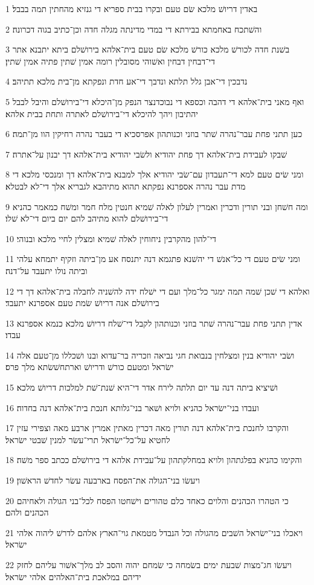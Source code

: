 \par 1 באדין דריושׁ מלכא שׂם טעם ובקרו בבית ספריא די גנזיא מהחתין תמה בבבל׃
\par 2 והשׁתכח באחמתא בבירתא די במדי מדינתה מגלה חדה וכן־כתיב בגוה דכרונה׃
\par 3 בשׁנת חדה לכורשׁ מלכא כורשׁ מלכא שׂם טעם בית־אלהא בירושׁלם ביתא יתבנא אתר די־דבחין דבחין ואשׁוהי מסובלין רומה אמין שׁתין פתיה אמין שׁתין׃
\par 4 נדבכין די־אבן גלל תלתא ונדבך די־אע חדת ונפקתא מן־בית מלכא תתיהב׃
\par 5 ואף מאני בית־אלהא די דהבה וכספא די נבוכדנצר הנפק מן־היכלא די־בירושׁלם והיבל לבבל יהתיבון ויהך להיכלא די־בירושׁלם לאתרה ותחת בבית אלהא׃
\par 6 כען תתני פחת עבר־נהרה שׁתר בוזני וכנותהון אפרסכיא די בעבר נהרה רחיקין הוו מן־תמה׃
\par 7 שׁבקו לעבידת בית־אלהא דך פחת יהודיא ולשׂבי יהודיא בית־אלהא דך יבנון על־אתרה׃
\par 8 ומני שׂים טעם למא די־תעבדון עם־שׂבי יהודיא אלך למבנא בית־אלהא דך ומנכסי מלכא די מדת עבר נהרה אספרנא נפקתא תהוא מתיהבא לגבריא אלך די־לא לבטלא׃
\par 9 ומה חשׁחן ובני תורין ודכרין ואמרין לעלון לאלה שׁמיא חנטין מלח חמר ומשׁח כמאמר כהניא די־בירושׁלם להוא מתיהב להם יום ביום די־לא שׁלו׃
\par 10 די־להון מהקרבין ניחוחין לאלה שׁמיא ומצלין לחיי מלכא ובנוהי׃
\par 11 ומני שׂים טעם די כל־אנשׁ די יהשׁנא פתגמא דנה יתנסח אע מן־ביתה וזקיף יתמחא עלהי וביתה נולו יתעבד על־דנה׃
\par 12 ואלהא די שׁכן שׁמה תמה ימגר כל־מלך ועם די ישׁלח ידה להשׁניה לחבלה בית־אלהא דך די בירושׁלם אנה דריושׁ שׂמת טעם אספרנא יתעבד׃
\par 13 אדין תתני פחת עבר־נהרה שׁתר בוזני וכנותהון לקבל די־שׁלח דריושׁ מלכא כנמא אספרנא עבדו׃
\par 14 ושׂבי יהודיא בנין ומצלחין בנבואת חגי נביאה וזכריה בר־עדוא ובנו ושׁכללו מן־טעם אלה ישׂראל ומטעם כורשׁ ודריושׁ וארתחשׁשׂתא מלך פרס׃
\par 15 ושׁיציא ביתה דנה עד יום תלתה לירח אדר די־היא שׁנת־שׁת למלכות דריושׁ מלכא׃
\par 16 ועבדו בני־ישׂראל כהניא ולויא ושׁאר בני־גלותא חנכת בית־אלהא דנה בחדוה׃
\par 17 והקרבו לחנכת בית־אלהא דנה תורין מאה דכרין מאתין אמרין ארבע מאה וצפירי עזין לחטיא על־כל־ישׂראל תרי־עשׂר למנין שׁבטי ישׂראל׃
\par 18 והקימו כהניא בפלגתהון ולויא במחלקתהון על־עבידת אלהא די בירושׁלם ככתב ספר משׁה׃
\par 19 ויעשׂו בני־הגולה את־הפסח בארבעה עשׂר לחדשׁ הראשׁון׃
\par 20 כי הטהרו הכהנים והלוים כאחד כלם טהורים וישׁחטו הפסח לכל־בני הגולה ולאחיהם הכהנים ולהם׃
\par 21 ויאכלו בני־ישׂראל השׁבים מהגולה וכל הנבדל מטמאת גוי־הארץ אלהם לדרשׁ ליהוה אלהי ישׂראל׃
\par 22 ויעשׂו חג־מצות שׁבעת ימים בשׂמחה כי שׂמחם יהוה והסב לב מלך־אשׁור עליהם לחזק ידיהם במלאכת בית־האלהים אלהי ישׂראל׃

